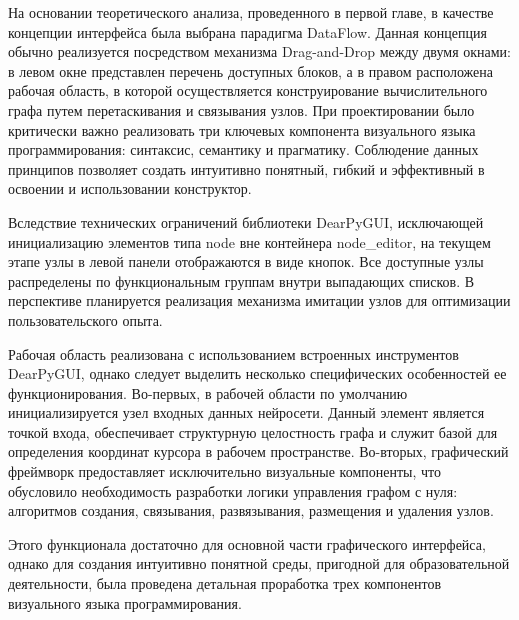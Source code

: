 \documentclass{report}
\begin{document}
На основании теоретического анализа, проведенного в первой главе, в качестве концепции интерфейса была выбрана парадигма DataFlow. Данная концепция обычно реализуется посредством механизма Drag-and-Drop между двумя окнами: в левом окне представлен перечень доступных блоков, а в правом расположена рабочая область, в которой осуществляется конструирование вычислительного графа путем перетаскивания и связывания узлов. При проектировании было критически важно реализовать три ключевых компонента визуального языка программирования: синтаксис, семантику и прагматику. Соблюдение данных принципов позволяет создать интуитивно понятный, гибкий и эффективный в освоении и использовании конструктор.

Вследствие технических ограничений библиотеки DearPyGUI, исключающей инициализацию элементов типа node вне контейнера node\_editor, на текущем этапе узлы в левой панели отображаются в виде кнопок. Все доступные узлы распределены по функциональным группам внутри выпадающих списков. В перспективе планируется реализация механизма имитации узлов для оптимизации пользовательского опыта.

Рабочая область реализована с использованием встроенных инструментов DearPyGUI, однако следует выделить несколько специфических особенностей ее функционирования. Во-первых, в рабочей области по умолчанию инициализируется узел входных данных нейросети. Данный элемент является точкой входа, обеспечивает структурную целостность графа и служит базой для определения координат курсора в рабочем пространстве. Во-вторых, графический фреймворк предоставляет исключительно визуальные компоненты, что обусловило необходимость разработки логики управления графом с нуля: алгоритмов создания, связывания, развязывания, размещения и удаления узлов.


Этого функционала достаточно для основной части графического интерфейса, однако для создания интуитивно понятной среды, пригодной для образовательной деятельности, была проведена детальная проработка трех компонентов визуального языка программирования.
\end{document}
